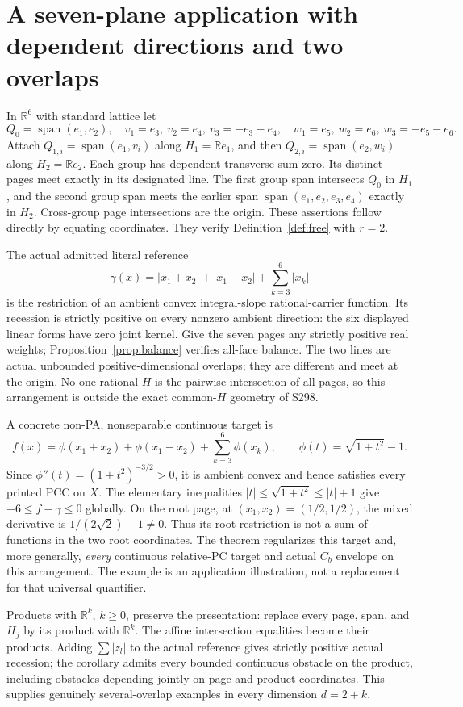 \documentclass[11pt]{article}
\newcommand{\R}{\mathbb R}
\begin{document}
\section{A seven-plane application with dependent directions and two overlaps}
In $\R^6$ with standard lattice let
\[
Q_0=\operatorname{span}(e_1,e_2),\quad
v_1=e_3,\ v_2=e_4,\ v_3=-e_3-e_4,\quad
w_1=e_5,\ w_2=e_6,\ w_3=-e_5-e_6.
\]
Attach $Q_{1,i}=\operatorname{span}(e_1,v_i)$ along $H_1=\R e_1$, and then $Q_{2,i}=\operatorname{span}(e_2,w_i)$ along $H_2=\R e_2$. Each group has dependent transverse sum zero. Its distinct pages meet exactly in its designated line. The first group span intersects $Q_0$ in $H_1$, and the second group span meets the earlier span $\operatorname{span}(e_1,e_2,e_3,e_4)$ exactly in $H_2$. Cross-group page intersections are the origin. These assertions follow directly by equating coordinates. They verify Definition~\ref{def:free} with $r=2$.

The actual admitted literal reference
\[
\gamma(x)=|x_1+x_2|+|x_1-x_2|+\sum_{k=3}^6|x_k|
\]
is the restriction of an ambient convex integral-slope rational-carrier function. Its recession is strictly positive on every nonzero ambient direction: the six displayed linear forms have zero joint kernel. Give the seven pages any strictly positive real weights; Proposition~\ref{prop:balance} verifies all-face balance. The two lines are actual unbounded positive-dimensional overlaps; they are different and meet at the origin. No one rational $H$ is the pairwise intersection of all pages, so this arrangement is outside the exact common-$H$ geometry of S298.

A concrete non-PA, nonseparable continuous target is
\[
f(x)=\phi(x_1+x_2)+\phi(x_1-x_2)+\sum_{k=3}^6\phi(x_k),
\qquad \phi(t)=\sqrt{1+t^2}-1.
\]
Since $\phi''(t)=(1+t^2)^{-3/2}>0$, it is ambient convex and hence satisfies every printed PCC on $X$. The elementary inequalities $|t|\leq\sqrt{1+t^2}\leq |t|+1$ give $-6\leq f-\gamma\leq0$ globally. On the root page, at $(x_1,x_2)=(1/2,1/2)$, the mixed derivative is $1/(2\sqrt2)-1\ne0$. Thus its root restriction is not a sum of functions in the two root coordinates. The theorem regularizes this target and, more generally, \emph{every} continuous relative-PC target and actual $C_b$ envelope on this arrangement. The example is an application illustration, not a replacement for that universal quantifier.

Products with $\R^k$, $k\geq0$, preserve the presentation: replace every page, span, and $H_j$ by its product with $\R^k$. The affine intersection equalities become their products. Adding $\sum|z_l|$ to the actual reference gives strictly positive actual recession; the corollary admits every bounded continuous obstacle on the product, including obstacles depending jointly on page and product coordinates. This supplies genuinely several-overlap examples in every dimension $d=2+k$.
\end{document}
